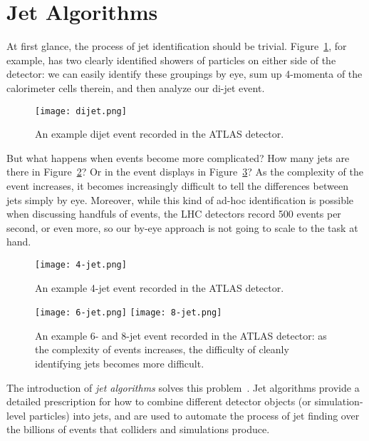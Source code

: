 \section{Jet Algorithms}

At first glance, the process of jet identification should be trivial. Figure~\ref{fig:jets:dijet}, for example, has two clearly identified showers of particles on either side of the detector: we can easily identify these groupings by eye, sum up 4-momenta of the calorimeter cells therein, and then analyze our di-jet event.



\begin{figure}
\centering
\texttt{[image: dijet.png]}
\label{fig:jets:dijet}
\caption{An example dijet event recorded in the ATLAS detector.}
\end{figure}


But what happens when events become more complicated? How many jets are there in Figure~\ref{fig:jets:4-jet}? Or in the event displays in Figure~\ref{fig:jets:many-jet}? As the complexity of the event increases, it becomes increasingly difficult to tell the differences between jets simply by eye. Moreover, while this kind of ad-hoc identification is possible when discussing handfuls of events, the LHC detectors record 500 events per second, or even more, so our by-eye approach is not going to scale to the task at hand. 


\begin{figure}
\centering
\texttt{[image: 4-jet.png]}
\label{fig:jets:4-jet}
\caption{An example 4-jet event recorded in the ATLAS detector.}
\end{figure}




\begin{figure}
\centering
\texttt{[image: 6-jet.png]}
\texttt{[image: 8-jet.png]}
\label{fig:jets:many-jet}
\caption{An example 6- and 8-jet event recorded in the ATLAS detector: as the complexity of events increases, the difficulty of cleanly identifying jets becomes more difficult.}
\end{figure}



The introduction of \textit{jet algorithms} solves this problem~\cite{Jetography}. Jet algorithms provide a detailed prescription for how to combine different detector objects (or simulation-level particles) into jets, and are used to automate the process of jet finding over the billions of events that colliders and simulations produce.

